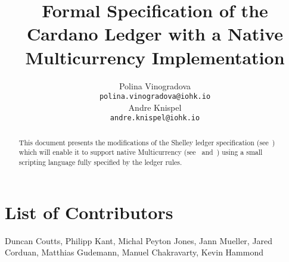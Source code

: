 
\title{Formal Specification of the Cardano Ledger with a Native
Multicurrency Implementation}

\author{
   Polina Vinogradova \\ {\small \texttt{polina.vinogradova@iohk.io}} \\
   Andre Knispel \\ {\small \texttt{andre.knispel@iohk.io}} \\
   }

\date{}

\maketitle

\begin{abstract}
This document presents the modifications of the Shelley ledger
specification
(see~\cite{shelley_spec}) which will enable it to support native
Multicurrency (see~\cite{multi_currency} and~\cite{formal_multicur})
using a small scripting language fully specified
by the ledger rules.
\end{abstract}

\section*{List of Contributors}
\label{acknowledgements}

Duncan Coutts,
Philipp Kant,
Michal Peyton Jones,
Jann Mueller,
Jared Corduan,
Matthias Gudemann,
Manuel Chakravarty,
Kevin Hammond
